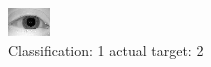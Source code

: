 \begin{figure}[h!]
\begin{center}
\includegraphics[width=0.60\columnwidth]{figures/ID871_class_1_target_2.png}
\end{center}
\caption{ Classification: 1 actual target: 2}
\label{fig:ID871_class_1_target_2}
\end{figure}

